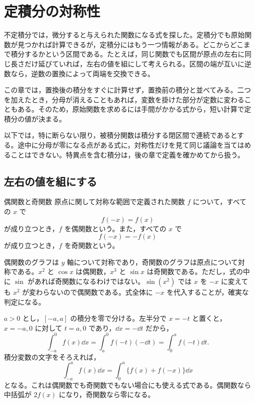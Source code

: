 \chapter{定積分の対称性}\label{章:定積分の対称性}

不定積分では，微分すると与えられた関数になる式を探した。定積分でも原始関数が見つかれば計算できるが，定積分にはもう一つ情報がある。どこからどこまで積分するかという区間である。たとえば，同じ関数でも区間が原点の左右に同じ長さだけ延びていれば，左右の値を組にして考えられる。区間の端が互いに逆数なら，逆数の置換によって両端を交換できる。

この章では，置換後の積分をすぐに計算せず，置換前の積分と並べてみる。二つを加えたとき，分母が消えることもあれば，変数を掛けた部分が定数に変わることもある。そのため，原始関数を求めるには手間がかかる式から，短い計算で定積分の値が決まる。

以下では，特に断らない限り，被積分関数は積分する閉区間で連続であるとする。途中に分母が零になる点がある式に，対称性だけを見て同じ議論を当てはめることはできない。特異点を含む積分は，後の章で定義を確かめてから扱う。

\section{左右の値を組にする}\label{節:奇偶の対称性}

\begin{definition}{偶関数と奇関数}
原点に関して対称な範囲で定義された関数 $f$ について，すべての $x$ で
\[
f(-x)=f(x)
\]
が成り立つとき，$f$ を偶関数という。また，すべての $x$ で
\[
f(-x)=-f(x)
\]
が成り立つとき，$f$ を奇関数という。
\end{definition}

偶関数のグラフは $y$ 軸について対称であり，奇関数のグラフは原点について対称である。$x^2$ と $\cos x$ は偶関数，$x^3$ と $\sin x$ は奇関数である。ただし，式の中に $\sin$ があれば奇関数になるわけではない。$\sin(x^2)$ では $x$ を $-x$ に変えても $x^2$ が変わらないので偶関数である。式全体に $-x$ を代入することが，確実な判定になる。

$a>0$ とし，$[-a,a]$ の積分を零で分ける。左半分で $x=-t$ と置くと，$x=-a,0$ に対して $t=a,0$ であり，$\dd x=-\dd t$ だから，
\[
\int_{-a}^{0}f(x)\dd x
 =\int_a^0 f(-t)(-\dd t)
 =\int_0^a f(-t)\dd t.
\]
積分変数の文字をそろえれば，
\begin{equation}\label{式:左右の積分}
\int_{-a}^a f(x)\dd x
 =\int_0^a\{f(x)+f(-x)\}\dd x
\end{equation}
となる。これは偶関数でも奇関数でもない場合にも使える式である。偶関数なら中括弧が $2f(x)$ になり，奇関数なら零になる。

